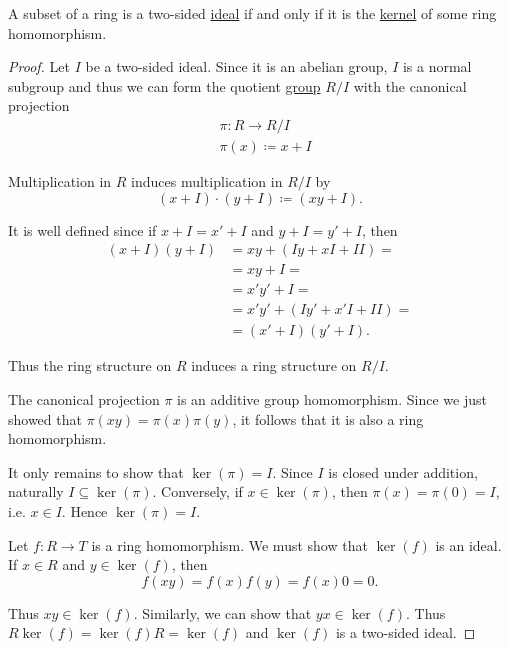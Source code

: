 \begin{Definition}\label{thm:semiring_ideal_iff_kernel}
  A subset of a ring is a two-sided \hyperref[def:semiring_ideal]{ideal} if and only if it is the \hyperref[def:semiring_kernel]{kernel} of some ring homomorphism.
\end{Definition}
\begin{proof}
  \ISufficiency Let \( I \) be a two-sided ideal. Since it is an abelian group, \( I \) is a normal subgroup and thus we can form the quotient \hyperref[def:normal_subgroup]{group} \( R / I \) with the canonical projection
  \begin{align*}
    &\pi: R \to R / I \\
    &\pi(x) \coloneqq x + I
  \end{align*}

  Multiplication in \( R \) induces multiplication in \( R / I \) by
  \begin{equation*}
    (x + I) \cdot (y + I) \coloneqq (xy + I).
  \end{equation*}

  It is well defined since if \( x + I = x' + I \) and \( y + I = y' + I \), then
  \begin{align*}
    (x + I) (y + I)
    &=
    xy + (Iy + xI + II)
    = \\ &=
    xy + I
    = \\ &=
    x'y' + I
    = \\ &=
    x'y' + (Iy' + x'I + II)
    = \\ &=
    (x' + I) (y' + I).
  \end{align*}

  Thus the ring structure on \( R \) induces a ring structure on \( R / I \).

  The canonical projection \( \pi \) is an additive group homomorphism. Since we just showed that \( \pi(xy) = \pi(x) \pi(y) \), it follows that it is also a ring homomorphism.

  It only remains to show that \( \ker(\pi) = I \). Since \( I \) is closed under addition, naturally \( I \subseteq \ker(\pi) \). Conversely, if \( x \in \ker(\pi) \), then \( \pi(x) = \pi(0) = I \), i.e. \( x \in I \). Hence \( \ker(\pi) = I \).

  \INecessity Let \( f: R \to T \) is a ring homomorphism. We must show that \( \ker(f) \) is an ideal. If \( x \in R \) and \( y \in \ker(f) \), then
  \begin{equation*}
    f(xy) = f(x) f(y) = f(x) 0 = 0.
  \end{equation*}

  Thus \( xy \in \ker(f) \). Similarly, we can show that \( yx \in \ker(f) \). Thus \( R \ker(f) = \ker(f) R = \ker(f) \) and \( \ker(f) \) is a two-sided ideal.
\end{proof}


